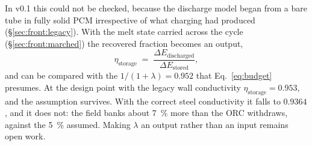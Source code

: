 In v0.1 this could not be checked, because the discharge model began from a bare
tube in fully solid PCM irrespective of what charging had produced
(\S\ref{sec:front:legacy}). With the melt state carried across the cycle
(\S\ref{sec:front:marched}) the recovered fraction becomes an output,
\begin{equation}
  \eta_{\mathrm{storage}}
  \;=\;
  \frac{\Delta E_{\mathrm{discharged}}}{\Delta E_{\mathrm{stored}}},
  \label{eq:eta-storage}
\end{equation}
and can be compared with the $1/(1+\lambda)=0.952$ that Eq.~\eqref{eq:budget}
presumes. At the design point with the legacy wall conductivity
$\eta_{\mathrm{storage}}=0.953$, and the assumption survives. With the correct
steel conductivity it falls to $0.9364$, and it does not: the field banks about
\SI{7}{\percent} more than the ORC withdraws, against the \SI{5}{\percent}
assumed. Making $\lambda$ an output rather than an input remains open work.

